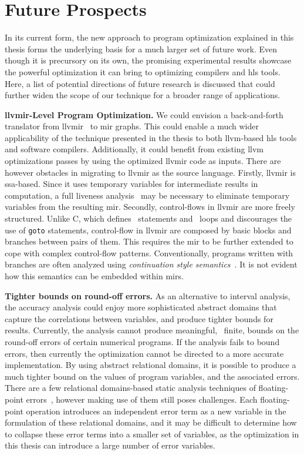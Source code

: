 \section{Future Prospects}
\label{cc:sec:future_prospects}

In its current form, the new approach to program optimization explained in this
thesis forms the underlying basis for a much larger set of future work.  Even
though it is precursory on its own, the promising experimental results showcase
the powerful optimization it can bring to optimizing compilers and \gls{hls}
tools.  Here, a list of potential directions of future research is discussed
that could further widen the scope of our technique for a broader range of
applications.

\textbf{\gls{llvmir}-Level Program Optimization.}  We could envision
a back-and-forth translator from \gls{llvmir}~\cite{llvm, llvm_ir} to
\gls{mir} graphs.  This could enable a much wider applicability of the
technique presented in the thesis to both \gls{llvm}-based \gls{hls} tools
and software compilers.  Additionally, it could benefit from existing
\gls{llvm} optimizations passes by using the optimized \gls{llvmir} code
as inputs.  There are however obstacles in migrating to \gls{llvmir} as
the source language.  Firstly, \gls{llvmir} is \gls{ssa}-based.  Since it
uses temporary variables for intermediate results in computation, a full
liveness analysis~\cite{hathhorn12, nielson99, boissinot08} may be necessary
to eliminate temporary variables from the resulting \gls{mir}\@.  Secondly,
control-flows in \gls{llvmir} are more freely structured.  Unlike C, which
defines \iflit~statements and \whilelit~loops and discourages the use of
\verb|goto| statements, control-flow in \gls{llvmir} are composed by basic
blocks and branches between pairs of them.  This requires the \gls{mir} to be
further extended to cope with complex control-flow patterns.  Conventionally,
programs written with branches are often analyzed using \emph{continuation
style semantics}~\cite{felleisen88}.  It is not evident how this semantics can
be embedded within \glspl{mir}.

\textbf{Tighter bounds on round-off errors.} As an alternative to interval
analysis, the accuracy analysis could enjoy more sophisticated abstract domains
that capture the correlations between variables, and produce tighter bounds
for results.  Currently, the analysis cannot produce meaningful, \ie~finite,
bounds on the round-off errors of certain numerical programs.  If the analysis
fails to bound errors, then currently the optimization cannot be directed
to a more accurate implementation.  By using abstract relational domains,
it is possible to produce a much tighter bound on the values of program
variables, and the associated errors.  There are a few relational domains-based
static analysis techniques of floating-point errors~\cite{mine07_2, putot04,
goubault11, astree}, however making use of them still poses challenges.  Each
floating-point operation introduces an independent error term as a new variable
in the formulation of these relational domains, and it may be difficult to
determine how to collapse these error terms into a smaller set of variables,
as the optimization in this thesis can introduce a large number of error
variables.

